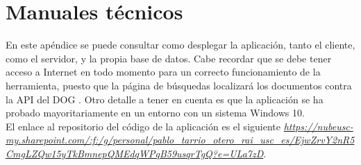 \chapter{Manuales técnicos}

En este apéndice se puede consultar como desplegar la aplicación, tanto el cliente, como el servidor, y la propia base de datos. Cabe recordar que se debe tener acceso a Internet en todo momento para un correcto funcionamiento de la herramienta, puesto que la página de búsquedas localizará los documentos contra la API del DOG \cite{dog}. Otro detalle a tener en cuenta es que la aplicación se ha probado mayoritariamente en un entorno con un sistema Windows 10.
\\

El enlace al repositorio del código de la aplicación es el siguiente {\it \url{https://nubeusc-my.sharepoint.com/:f:/g/personal/pablo_tarrio_otero_rai_usc_es/EjwZrvY2nR5CmgLZQw15yTkBmnepQMEdqWPqB59usqrTgQ?e=ULa7zD}}.


